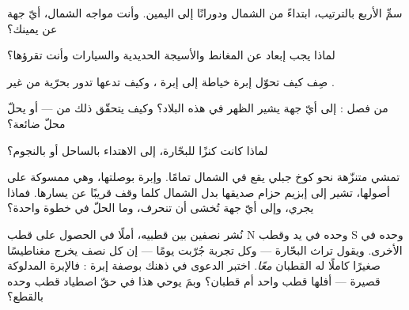 \begin{exercise}[$\star$]\label{exo:g4:magnets-and-compass:5}
سمِّ  الأربع بالترتيب، ابتداءً من الشمال ودورانًا
إلى اليمين. وأنت مواجه الشمال، أيّ جهة عن يمينك؟
\end{exercise}

\begin{exercise}[$\star$]\label{exo:g4:magnets-and-compass:6}
لماذا يجب إبعاد  عن المغانط والأسيجة الحديدية والسيارات
وأنت تقرؤها؟
\end{exercise}

\begin{exercise}[$\star$]\label{exo:g4:magnets-and-compass:7}
صِف كيف تحوّل إبرة خياطة إلى إبرة ، وكيف تدعها تدور بحرّية
من غير .
\end{exercise}

\begin{exercise}[$\star$]\label{exo:g4:magnets-and-compass:8}
من فصل : إلى أيّ جهة يشير  الظهر في هذه البلاد؟ وكيف
يتحقّق ذلك من  --- أو يحلّ محلّ  ضائعة؟
\end{exercise}

\begin{exercise}[$\star$]\label{exo:g4:magnets-and-compass:9}
لماذا كانت  كنزًا للبحّارة،  إلى الاهتداء بالساحل
أو بالنجوم؟
\end{exercise}

\begin{exercise}[$\star\star$]\label{exo:g4:magnets-and-compass:10}
تمشي متنزّهة نحو كوخ جبلي يقع في الشمال تمامًا. وإبرة بوصلتها،
وهي ممسوكة على أصولها، تشير إلى إبزيم حزام صديقها بدل الشمال
كلما وقف قريبًا عن يسارها. فماذا يجري، وإلى أيّ جهة تُخشى أن
تنحرف، وما الحلّ في خطوة واحدة؟
\end{exercise}

\begin{exercise}[$\star\star$]\label{exo:g4:magnets-and-compass:11}
نُشر  نصفين بين قطبيه، أملًا في الحصول على قطب N وحده في
يد وقطب S وحده في الأخرى. ويقول تراث البحّارة --- وكل تجربة
جُرّبت يومًا --- إن كل نصف يخرج مغناطيسًا صغيرًا كاملًا له
القطبان \emph{معًا}. اختبر الدعوى في ذهنك بوصفة إبرة :
فالإبرة المدلوكة قصيرة --- أفلها قطب واحد أم قطبان؟ وبمَ يوحي
هذا في حقّ اصطياد قطب وحده بالقطع؟
\end{exercise}
